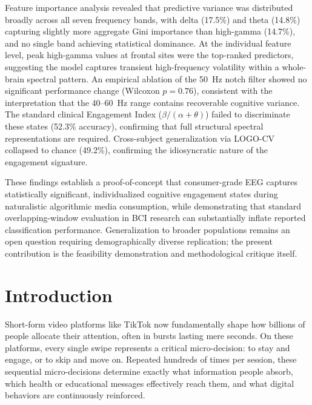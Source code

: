 \documentclass[12pt,a4paper]{report}
\begin{document}
Feature importance analysis revealed that predictive variance was distributed broadly across all seven frequency bands, with delta (17.5\%) and theta (14.8\%) capturing slightly more aggregate Gini importance than high-gamma (14.7\%), and no single band achieving statistical dominance. At the individual feature level, peak high-gamma values at frontal sites were the top-ranked predictors, suggesting the model captures transient high-frequency volatility within a whole-brain spectral pattern. An empirical ablation of the 50~Hz notch filter showed no significant performance change (Wilcoxon $p=0.76$), consistent with the interpretation that the 40--60~Hz range contains recoverable cognitive variance. The standard clinical Engagement Index ($\beta/(\alpha+\theta)$) failed to discriminate these states (52.3\% accuracy), confirming that full structural spectral representations are required. Cross-subject generalization via LOGO-CV collapsed to chance (49.2\%), confirming the idiosyncratic nature of the engagement signature.

These findings establish a proof-of-concept that consumer-grade EEG captures statistically significant, individualized cognitive engagement states during naturalistic algorithmic media consumption, while demonstrating that standard overlapping-window evaluation in BCI research can substantially inflate reported classification performance. Generalization to broader populations remains an open question requiring demographically diverse replication; the present contribution is the feasibility demonstration and methodological critique itself.

\chapter{Introduction}
Short-form video platforms like TikTok now fundamentally shape how billions of people allocate their attention, often in bursts lasting mere seconds. On these platforms, every single swipe represents a critical micro-decision: to stay and engage, or to skip and move on. Repeated hundreds of times per session, these sequential micro-decisions determine exactly what information people absorb, which health or educational messages effectively reach them, and what digital behaviors are continuously reinforced.
\end{document}
